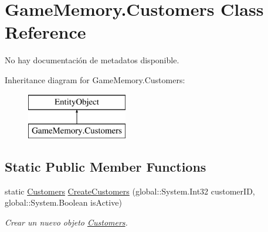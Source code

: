 \hypertarget{class_game_memory_1_1_customers}{\section{Game\-Memory.\-Customers Class Reference}
\label{class_game_memory_1_1_customers}
}


No hay documentación de metadatos disponible.  


Inheritance diagram for Game\-Memory.\-Customers\-:\begin{figure}[H]
\begin{center}
\leavevmode
\includegraphics[height=2.000000cm]{class_game_memory_1_1_customers}
\end{center}
\end{figure}
\subsection*{Static Public Member Functions}
\begin{DoxyCompactItemize}
\item 
static \hyperlink{class_game_memory_1_1_customers}{Customers} \hyperlink{class_game_memory_1_1_customers_a7815e50d690b5ce6aa6c1b2dee73ac81}{Create\-Customers} (global\-::\-System.\-Int32 customer\-I\-D, global\-::\-System.\-Boolean is\-Active)
\begin{DoxyCompactList}\small\item\em Crear un nuevo objeto \hyperlink{class_game_memory_1_1_customers}{Customers}. \end{DoxyCompactList}\end{DoxyCompactItemize}
